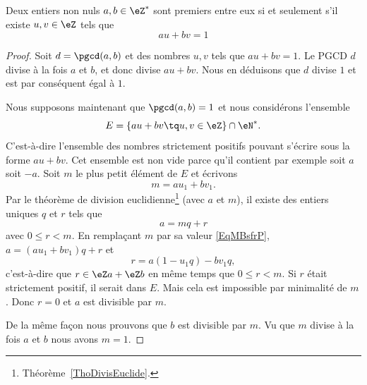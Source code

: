 \begin{theorem} \label{ThoBuNjam}
    Deux entiers non nuls \( a,b\in\eZ^*\) sont premiers entre eux si et seulement s'il existe \( u,v\in\eZ\) tels que
    \begin{equation}
        au+bv=1
    \end{equation}
\end{theorem}

\begin{proof}
    Soit \( d=\pgcd(a,b)\) et des nombres \( u,v\) tels que \( au+bv=1\). Le PGCD \( d\) divise à la fois \( a\) et \( b\), et donc divise \( au+bv\). Nous en déduisons que \( d\) divise \( 1\) et est par conséquent égal à \( 1\).

    Nous supposons maintenant que \( \pgcd(a,b)=1\) et nous considérons l'ensemble
    \begin{equation}
        E=\{ au+bv\tq u,v\in \eZ \}\cap \eN^*.
    \end{equation}
    C'est-à-dire l'ensemble des nombres strictement positifs pouvant s'écrire sous la forme \( au+bv\). Cet ensemble est non vide parce qu'il contient par exemple soit \( a\) soit \( -a\). Soit \( m\) le plus petit élément de \( E\) et écrivons
    \begin{equation}    \label{EqMBsfrP}
        m=au_1+bv_1.
    \end{equation}
    Par le théorème de division euclidienne\footnote{Théorème~\ref{ThoDivisEuclide}.} (avec \( a\) et \( m\)), il existe des entiers uniques $q$ et $r$ tels que
    \begin{equation}
        a=mq+r
    \end{equation}
    avec \( 0\leq r<m\). En remplaçant \( m\) par sa valeur \eqref{EqMBsfrP}, \( a=(au_1+bv_1)q+r\) et
    \begin{equation}
        r=a(1-u_1q)-bv_1q,
    \end{equation}
    c'est-à-dire que \( r\in \eZ a+\eZ b\) en même temps que \( 0\leq r<m\). Si \( r\) était strictement positif, il serait dans \( E\). Mais cela est impossible par minimalité de \( m\). Donc \( r=0\) et \( a\) est divisible par \( m\).

    De la même façon nous prouvons que \( b\) est divisible par \( m\). Vu que \( m\) divise à la fois \( a\) et \( b\) nous avons \( m=1\).
\end{proof}

